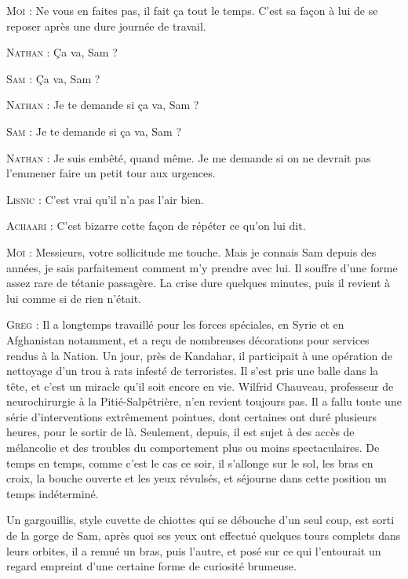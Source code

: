 \begin{dialogue}

\textsc{Moi} : Ne vous en faites pas, il fait ça tout le temps. C’est sa façon à lui de se reposer après une dure journée de travail.

\textsc{Nathan} : Ça va, Sam ?

\textsc{Sam} : Ça va, Sam ?

\textsc{Nathan} : Je te demande si ça va, Sam ?

\textsc{Sam} : Je te demande si ça va, Sam ?

\textsc{Nathan} : Je suis embêté, quand même. Je me demande si on ne devrait pas l’emmener faire un petit tour aux urgences.

\textsc{Lisnic} : C’est vrai qu’il n’a pas l’air bien.

\textsc{Achaari} : C’est bizarre cette façon de répéter ce qu’on lui dit.

\textsc{Moi} : Messieurs, votre sollicitude me touche. Mais je connais Sam depuis des années, je sais parfaitement comment m’y prendre avec lui. Il souffre d’une forme assez rare de tétanie passagère. La crise dure quelques minutes, puis il revient à lui comme si de rien n’était.

\textsc{Greg} : Il a longtemps travaillé pour les forces spéciales, en Syrie et en Afghanistan notamment, et a reçu de nombreuses décorations pour services rendus à la Nation. Un jour, près de Kandahar, il participait à une opération de nettoyage d’un trou à rats infesté de terroristes. Il s’est pris une balle dans la tête, et c’est un miracle qu’il soit encore en vie. Wilfrid Chauveau, professeur de neurochirurgie à la Pitié-Salpêtrière, n’en revient toujours pas. Il a fallu toute une série d’interventions extrêmement pointues, dont certaines ont duré plusieurs heures, pour le sortir de là. Seulement, depuis, il est sujet à des accès de mélancolie et des troubles du comportement plus ou moins spectaculaires. De temps en temps, comme c’est le cas ce soir, il s’allonge sur le sol, les bras en croix, la bouche ouverte et les yeux révulsés, et séjourne dans cette position un temps indéterminé.

\end{dialogue}

Un gargouillis, style cuvette de chiottes qui se débouche d’un seul coup, est sorti de la gorge de Sam, après quoi ses yeux ont effectué quelques tours complets dans leurs orbites, il a remué un bras, puis l’autre, et posé sur ce qui l’entourait un regard empreint d’une certaine forme de curiosité brumeuse.


